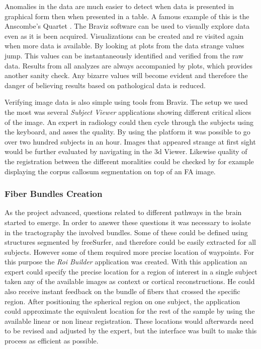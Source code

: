 Anomalies in the data are much easier to detect when data is presented in graphical form then when presented in a table. A famous example of this is the Anscombe's Quartet \autocite{anscombe_graphs_1973}. The Braviz software can be used to visually explore data even as it is been acquired. Visualizations can be created and re visited again when more data is available. By looking at plots from the data strange values jump. This values can be instantaneously identified and verified from the raw data. Results from all analyzes are always accompanied by plots, which provides another sanity check. Any bizarre values will become evident and therefore the danger of believing results based on pathological data is reduced.

Verifying image data is also simple using tools from Braviz. The setup we used the most was several \emph{Subject Viewer} applications showing different critical slices of the image. An expert in radiology could then cycle through the subjects using the keyboard, and asses the quality. By using the platform it was possible to go over two hundred subjects in an hour. Images that appeared strange at first sight would be further evaluated by navigating in the 3d Viewer. Likewise quality of the registration between the different moralities could be checked by for example displaying the corpus callosum segmentation on top of an FA image. 

\subsubsection{Fiber Bundles Creation}

As the project advanced, questions related to different pathways in the brain started to emerge. In order to answer these questions it was necessary to isolate in the tractography the involved bundles. Some of these could be defined using structures segmented by freeSurfer, and therefore could be easily extracted for all subjects. However some of them required more precise location of waypoints. For this purpose the \emph{Roi Builder} application was created. With this application an expert could specify the precise location for a region of interest in a single subject taken any of the available images as context or cortical reconstructions. He could also receive instant feedback on the bundle of fibers that crossed the specific region. After positioning the spherical region on one subject, the application could approximate the equivalent location for the rest of the sample by using the available linear or non linear registration. These locations would afterwards need to be revised and adjusted by the expert, but the interface was built to make this process as efficient as possible.

